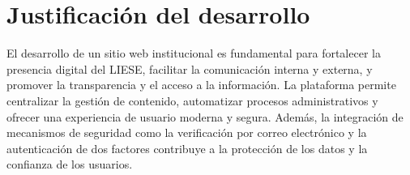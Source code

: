 \section{Justificación del desarrollo}
El desarrollo de un sitio web institucional es fundamental para fortalecer la presencia digital del LIESE, facilitar la comunicación interna y externa, y promover la transparencia y el acceso a la información. La plataforma permite centralizar la gestión de contenido, automatizar procesos administrativos y ofrecer una experiencia de usuario moderna y segura. Además, la integración de mecanismos de seguridad como la verificación por correo electrónico y la autenticación de dos factores contribuye a la protección de los datos y la confianza de los usuarios.
